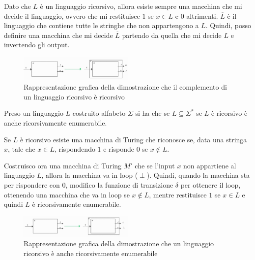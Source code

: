 \begin{dimostrazione}
    Dato che $L$ è un linguaggio ricorsivo, allora esiste sempre una macchina che
    mi decide il linguaggio, ovvero che mi restituisce $1$ se $x \in L$ e $0$
    altrimenti. $\overline{L}$ è il linguaggio che contiene tutte le stringhe
    che non appartengono a $L$. Quindi, posso definire una macchina che mi
    decide $\overline{L}$ partendo da quella che mi decide $L$ e invertendo gli
    output.
    \begin{figure}[!ht]
        \centering
        \includegraphics[width=0.5\textwidth]{img/MacchineTuring/dimostrazione1.png}
        \caption{Rappresentazione grafica della dimostrazione che il complemento
            di un linguaggio ricorsivo è ricorsivo}
    \end{figure}
\end{dimostrazione}
\begin{teorema}
    Preso un linguaggio $L$ costruito alfabeto $\Sigma$ si ha che se
    $L \subseteq \Sigma^{\ast}$ se $L$ è ricorsivo è anche ricorsivamente
    enumerabile.
\end{teorema}
\begin{dimostrazione}
    Se $L$ è ricorsivo esiste una macchina di Turing che riconosce se, data una
    stringa $x$, tale che $x \in L$, rispondendo $1$ e risponde $0$ se $x \not\in
        L$.

    Costruisco ora una macchina di Turing $M'$ che se l'input $x$ non appartiene
    al linguaggio $L$, allora la macchina va in loop ($\perp$). Quindi, quando
    la macchina sta per rispondere con $0$, modifico la funzione di transizione
    $\delta$ per ottenere il loop, ottenendo una macchina che va in loop se
    $x \not\in L$, mentre restituisce $1$ se $x \in L$ e quindi $L$ è ricorsivamente
    enumerabile.
    \begin{figure}[!ht]
        \centering
        \includegraphics[width=0.5\textwidth]{img/MacchineTuring/dimostrazione2.png}
        \caption{Rappresentazione grafica della dimostrazione che un linguaggio
            ricorsivo è anche ricorsivamente enumerabile}
    \end{figure}
\end{dimostrazione}
